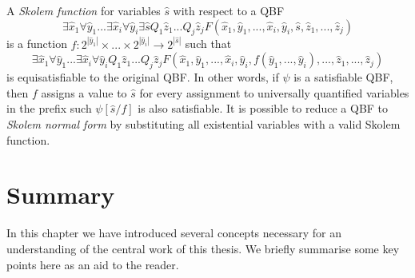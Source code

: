 A \emph{Skolem function} for variables $\hat{s}$ with respect to a QBF $$\exists \hat{x}_1 \forall \hat{y}_1 ... \exists \hat{x}_i \forall \hat{y}_i \exists \hat{s} Q_1 \hat{z}_1 ... Q_j \hat{z}_j F(\hat{x}_1, \hat{y}_1, ..., \hat{x}_i, \hat{y}_i, \hat{s}, \hat{z}_1, ..., \hat{z}_j)$$ is a function $f : 2^{|\hat{y}_1|} \times ... \times 2^{|\hat{y}_i|} \to 2^{|\hat{s}|}$ such that $$\exists \hat{x}_1 \forall \hat{y}_1 ... \exists \hat{x}_i \forall \hat{y}_i Q_1 \hat{z}_1 ... Q_j \hat{z}_j F(\hat{x}_1, \hat{y}_1, ..., \hat{x}_i, \hat{y}_i, f(\hat{y}_1, ..., \hat{y}_i), ..., \hat{z}_1, ..., \hat{z}_j)$$ is equisatisfiable to the original QBF. In other words, if $\psi$ is a satisfiable QBF, then $f$ assigns a value to $\hat{s}$ for every assignment to universally quantified variables in the prefix such $\psi[\hat{s} / f]$ is also satisfiable. It is possible to reduce a QBF to \emph{Skolem normal form} by substituting all existential variables with a valid Skolem function.


\section{Summary}

In this chapter we have introduced several concepts necessary for an understanding of the central work of this thesis. We briefly summarise some key points here as an aid to the reader.


